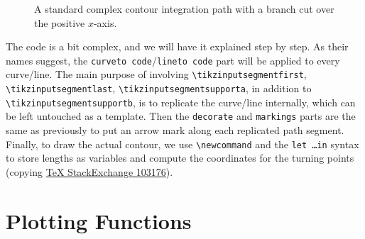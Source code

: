 \begin{figure}
    \centering
    \caption{A standard complex contour integration path with a branch cut over the positive $x$-axis.}
    \label{fig:complexcontour}
\end{figure}
The code is a bit complex, and we will have it explained step by step. As their names suggest, the \texttt{curveto code}/\texttt{lineto code} part will be applied to every curve/line. The main purpose of involving \texttt{\textbackslash tikzinputsegmentfirst}, \texttt{\textbackslash tikzinputsegmentlast}, \texttt{\textbackslash tikzinputsegmentsupporta}, in addition to \texttt{\textbackslash tikzinputsegmentsupportb}, is to replicate the curve/line internally, which can be left untouched as a template. Then the \texttt{decorate} and \texttt{markings} parts are the same as previously to put an arrow mark along each replicated path segment. Finally, to draw the actual contour, we use \texttt{\textbackslash newcommand} and the \texttt{let \ldots in} syntax to store lengths as variables and compute the coordinates for the turning points (copying \href{https://tex.stackexchange.com/questions/103176/drawing-complex-integration}{\TeX{} StackExchange 103176}).

\section{Plotting Functions}

